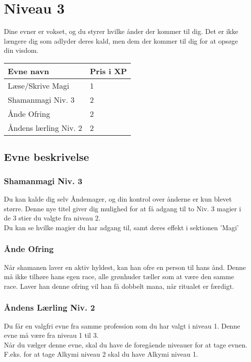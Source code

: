 \chapter{Niveau 3}
Dine evner er vokset, og du styrer hvilke ånder der kommer til dig. Det er ikke længere dig som adlyder deres kald, men dem der kommer til dig for at opsøge din visdom.

\begin{table}[H]
    \centering
    \begin{tabular}{|p{}|p{}|}
    \rowcolor{cerulean!80}\hline
        Evne navn & Pris i XP \\\hline
        Læse/Skrive Magi & 1\\\hline
        Shamanmagi Niv. 3& 2\\\hline
        Ånde Ofring& 2\\\hline
        Åndens lærling Niv. 2& 2\\\hline
    \end{tabular}
\end{table}
\section{Evne beskrivelse}



\subsection{Shamanmagi Niv. 3}
Du kan kalde dig selv Åndemager, og din kontrol over ånderne er kun blevet større. Denne nye titel giver dig mulighed for at få adgang til to Niv. 3 magier i de 3 stier du valgte fra niveau 2.\\
Du kan se hvilke magier du har adgang til, samt deres effekt i sektionen 'Magi'\\

\subsection{Ånde Ofring}
Når shamanen laver en aktiv hyldest, kan han ofre en person til hans ånd. Denne må ikke tilhøre hans egen race, alle grønhuder tæller som at være den samme race. Laver han denne ofring vil han få dobbelt mana, når ritualet er færdigt.

\subsection{Åndens Lærling Niv. 2}
Du får en valgfri evne fra samme profession som du har valgt i niveau 1. Denne evne må være fra niveau 1 til 3.\\
Når du vælger denne evne, skal du have de foregående niveauer for at tage evnen. F.eks. for at tage Alkymi niveau 2 skal du have Alkymi niveau 1.